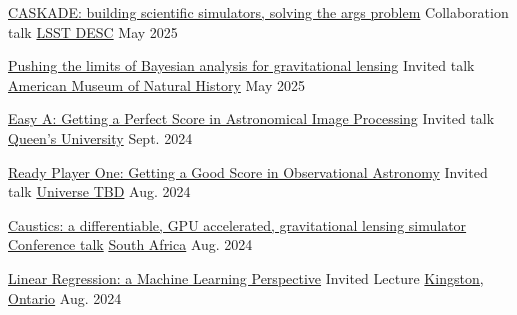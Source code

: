 \begin{cvhonors}
  \cvhonor
    {\href{https://docs.google.com/presentation/d/1QFVPejlb3gYZWp2Gq23xjOdOo_OAjUghfXRCsXNRIc0/edit?usp=sharing}{CASKADE: building scientific simulators, solving the args problem}} %
    {Collaboration talk} %
    {\href{https://lsstdesc.org/}{LSST DESC}} %
    {May 2025} %

  \cvhonor
    {\href{https://docs.google.com/presentation/d/1c9jGcY01oJoyRw3vdq1ce4UKplyIuXBpUqNST7bAOqE/edit?usp=sharing}{Pushing the limits of Bayesian analysis for gravitational lensing}} %
    {Invited talk} %
    {\href{https://www.amnh.org/}{American Museum of Natural History}} %
    {May 2025} %

  \cvhonor
    {\href{https://docs.google.com/presentation/d/1LGkNJcvMlP8Ywx0Mptpj7-fn3nBrAnYgwVIZAjCYyMk/edit?usp=sharing}{Easy A: Getting a Perfect Score in Astronomical Image Processing}} %
    {Invited talk} %
    {\href{https://www.queensu.ca/}{Queen's University}} %
    {Sept. 2024} %

  \cvhonor
    {\href{https://docs.google.com/presentation/d/1GpuXR7yP2s3ppgkc07M7LD57CUwm9ybfgIzB4Ai9V8I/edit?usp=sharing}{Ready Player One: Getting a Good Score in Observational Astronomy}} %
    {Invited talk} %
    {\href{https://universetbd.org/}{Universe TBD}} %
    {Aug. 2024} %

  \cvhonor
    {\href{https://youtu.be/PCmzFRLySl4?t=23988}{Caustics: a differentiable, GPU accelerated, gravitational lensing simulator}} %
    {\href{https://astronomy2024.org/}{Conference talk}} %
    {\href{https://astronomy2024.org/}{South Africa}} %
    {Aug. 2024} %
    
  \cvhonor
    {\href{https://colab.research.google.com/drive/1EYraAvpAKUirenM8FO1O0MmDEpI9tlkb?usp=sharing}{Linear Regression: a Machine Learning Perspective}} %
    {Invited Lecture} %
    {\href{https://www.queensu.ca/}{Kingston, Ontario}} %
    {Aug. 2024} %
    

\end{cvhonors}
